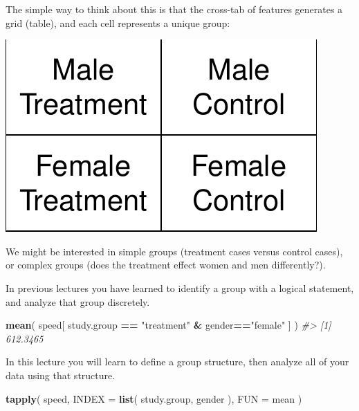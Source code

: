 \documentclass[]{book}
\newenvironment{Shaded}{\begin{snugshade}}{\end{snugshade}}
\newcommand{\CommentTok}[1]{\textcolor[rgb]{0.56,0.35,0.01}{\textit{#1}}}
\newcommand{\DataTypeTok}[1]{\textcolor[rgb]{0.13,0.29,0.53}{#1}}
\newcommand{\KeywordTok}[1]{\textcolor[rgb]{0.13,0.29,0.53}{\textbf{#1}}}
\newcommand{\NormalTok}[1]{#1}
\newcommand{\OperatorTok}[1]{\textcolor[rgb]{0.81,0.36,0.00}{\textbf{#1}}}
\newcommand{\StringTok}[1]{\textcolor[rgb]{0.31,0.60,0.02}{#1}}
\theoremstyle{definition}
\theoremstyle{definition}
\theoremstyle{definition}
\theoremstyle{remark}
\begin{document}
The simple way to think about this is that the cross-tab of features
generates a grid (table), and each cell represents a unique group:

\begin{center}\includegraphics[width=0.7\linewidth]{DS4PS-I_files/figure-latex/unnamed-chunk-103-1} \end{center}

We might be interested in simple groups (treatment cases versus control
cases), or complex groups (does the treatment effect women and men
differently?).

In previous lectures you have learned to identify a group with a logical
statement, and analyze that group discretely.

\begin{Shaded}
\begin{Highlighting}[]

\KeywordTok{mean}\NormalTok{( speed[ study.group }\OperatorTok{==}\StringTok{ "treatment"} \OperatorTok{&}\StringTok{ }\NormalTok{gender}\OperatorTok{==}\StringTok{"female"}\NormalTok{ ] )}
\CommentTok{#> [1] 612.3465}
\end{Highlighting}
\end{Shaded}

In this lecture you will learn to define a group structure, then analyze
all of your data using that structure.

\begin{Shaded}
\begin{Highlighting}[]

\KeywordTok{tapply}\NormalTok{( speed, }\DataTypeTok{INDEX =} \KeywordTok{list}\NormalTok{( study.group, gender ), }\DataTypeTok{FUN =}\NormalTok{ mean )}
\end{Highlighting}
\end{Shaded}
\end{document}
